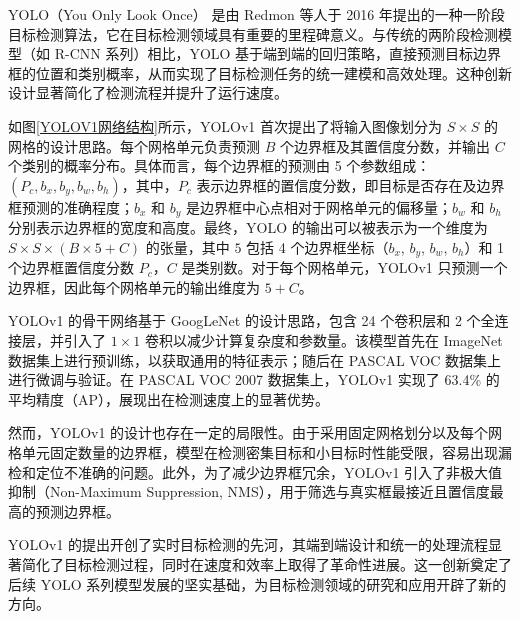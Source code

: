 \documentclass[11pt,twocolumn]{ctexart}
\begin{document}
YOLO（You Only Look Once）\cite{redmon2016you} 是由 Redmon 等人于 2016 年提出的一种一阶段目标检测算法，它在目标检测领域具有重要的里程碑意义。与传统的两阶段检测模型（如 R-CNN\cite{girshick2014rich,girshick2015fast,ren2016faster} 系列）相比，YOLO 基于端到端的回归策略，直接预测目标边界框的位置和类别概率，从而实现了目标检测任务的统一建模和高效处理。这种创新设计显著简化了检测流程并提升了运行速度。

如图\ref{YOLOV1网络结构}所示，YOLOv1 首次提出了将输入图像划分为 $S \times S$ 的网格的设计思路。每个网格单元负责预测 $B$ 个边界框及其置信度分数，并输出 $C$ 个类别的概率分布。具体而言，每个边界框的预测由 5 个参数组成：$(P_c, b_x, b_y, b_w, b_h)$，其中，$P_c$ 表示边界框的置信度分数，即目标是否存在及边界框预测的准确程度；$b_x$ 和 $b_y$ 是边界框中心点相对于网格单元的偏移量；$b_w$ 和 $b_h$ 分别表示边界框的宽度和高度。最终，YOLO 的输出可以被表示为一个维度为 $S \times S \times (B \times 5 + C)$ 的张量，其中 $5$ 包括 4 个边界框坐标（$b_x$, $b_y$, $b_w$, $b_h$）和 1 个边界框置信度分数 $P_c$，$C$ 是类别数。对于每个网格单元，YOLOv1 只预测一个边界框，因此每个网格单元的输出维度为 $5 + C$。



YOLOv1 的骨干网络基于 GoogLeNet\cite{szegedy2015going} 的设计思路，包含 24 个卷积层和 2 个全连接层，并引入了 $1 \times 1$ 卷积以减少计算复杂度和参数量。该模型首先在 ImageNet 数据集上进行预训练，以获取通用的特征表示；随后在 PASCAL VOC 数据集上进行微调与验证。在 PASCAL VOC 2007 数据集上，YOLOv1 实现了 63.4\% 的平均精度（AP），展现出在检测速度上的显著优势。

然而，YOLOv1 的设计也存在一定的局限性。由于采用固定网格划分以及每个网格单元固定数量的边界框，模型在检测密集目标和小目标时性能受限，容易出现漏检和定位不准确的问题。此外，为了减少边界框冗余，YOLOv1 引入了非极大值抑制\cite{neubeck2006efficient}（Non-Maximum Suppression, NMS），用于筛选与真实框最接近且置信度最高的预测边界框。

YOLOv1 的提出开创了实时目标检测的先河，其端到端设计和统一的处理流程显著简化了目标检测过程，同时在速度和效率上取得了革命性进展。这一创新奠定了后续 YOLO 系列模型发展的坚实基础，为目标检测领域的研究和应用开辟了新的方向。
\end{document}
